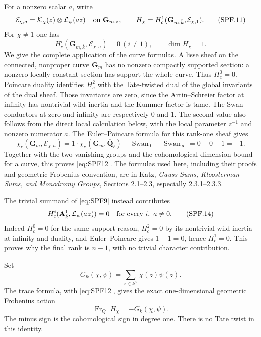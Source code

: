 For a nonzero scalar \(a\), write
\[
 \mathcal E_{\chi,a}=
       \mathcal K_\chi(z)\otimes\mathcal L_\psi(az)
       \quad\hbox{on }\mathbf G_{m,z},\qquad
 H_\chi=H_c^1(\mathbf G_{m,\bar k},\mathcal E_{\chi,1}).
 \tag{SPF.11}\label{eq:SPF11}
\]
For \(\chi\ne1\) one has
\[
 H_c^i(\mathbf G_{m,\bar k},\mathcal E_{\chi,a})=0
       \ (i\ne1),\qquad
 \dim H_\chi=1.
 \tag{SPF.12}\label{eq:SPF12}
\]
We give the complete application of the curve formulas. A lisse
sheaf on the connected, nonproper curve \(\mathbf G_m\) has no
nonzero compactly supported section: a nonzero locally constant
section has support the whole curve. Thus \(H_c^0=0\).
Poincare duality identifies \(H_c^2\) with the Tate-twisted dual
of the global invariants of the dual sheaf. Those invariants
are zero, since the Artin--Schreier factor at infinity has
nontrivial wild inertia and the Kummer factor is tame.
The Swan conductors at zero and infinity are respectively \(0\)
and \(1\). The second value also follows from the direct local
calculation below, with the local parameter \(z^{-1}\) and
nonzero numerator \(a\). The Euler--Poincare formula for this
rank-one sheaf gives
\[
 \chi_c(\mathbf G_m,\mathcal E_{\chi,a})
  =1\cdot\chi_c(\mathbf G_m,\overline{\mathbf Q}_\ell)
        -\operatorname{Swan}_0-\operatorname{Swan}_\infty
  =0-0-1=-1.
 \tag{SPF.13}\label{eq:SPF13}
\]
Together with the two vanishing groups and the cohomological
dimension bound for a curve, this proves \eqref{eq:SPF12}.
The formulas used here, including their proofs and geometric
Frobenius convention, are in Katz,
\emph{Gauss Sums, Kloosterman Sums, and Monodromy Groups},
Sections 2.1--2.3, especially 2.3.1--2.3.3.

The trivial summand of \eqref{eq:SPF9} instead contributes
\[
 H_c^i(\mathbf A^1_{\bar k},\mathcal L_\psi(az))=0
                       \quad\hbox{for every }i,\ a\ne0.
 \tag{SPF.14}\label{eq:SPF14}
\]
Indeed \(H_c^0=0\) for the same support reason, \(H_c^2=0\)
by its nontrivial wild inertia at infinity and duality, and
Euler--Poincare gives \(1-1=0\), hence \(H_c^1=0\).
This proves why the final rank is \(n-1\), with no trivial
character contribution.

Set
\[
 G_k(\chi,\psi)=\sum_{z\in k^\times}\chi(z)\psi(z).
 \tag{SPF.15}\label{eq:SPF15}
\]
The trace formula, with \eqref{eq:SPF12}, gives the exact
one-dimensional geometric Frobenius action
\[
 \operatorname{Fr}_Q\big|H_\chi
       =-G_k(\chi,\psi).
 \tag{SPF.16}\label{eq:SPF16}
\]
The minus sign is the cohomological sign in degree one.
There is no Tate twist in this identity.

